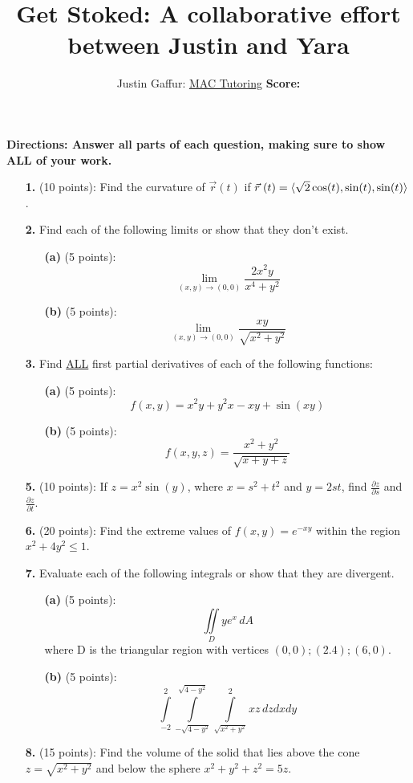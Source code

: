 \documentclass[a4paper, 12pt]{article} %
\title[Gaffur: Practice Exam]{Get Stoked: A collaborative effort between Justin and Yara}
\author[MAC Tutoring]{Justin Gaffur: \hspace{2mm}  \underline{MAC Tutoring} \hspace{35mm} \textbf{Score:}}
\numberwithin{equation}{section}
\begin{document}
\maketitle %

\textbf{Directions: Answer all parts of each question, making sure to show ALL of your work.}
\begin{enumerate}
\item[\textbf{1.}] (10 points): Find the curvature of $\vec{r}(t)$ if $\vec{r}\hspace{1mm}(t)=\langle \sqrt{2}\cos(t), \sin(t), \sin(t) \rangle$.
\vspace{75mm}

\item[\textbf{2.}] Find each of the following limits or show that they don't exist.
\begin{enumerate}
\item[\textbf{(a)}] (5 points):
$$
\lim_{(x,y)\to (0,0)}\frac{2x^2y}{x^4+y^2}
$$
\vspace{60mm}
\item[\textbf{(b)}] (5 points):
$$
\lim_{(x,y)\to (0,0)}\frac{xy}{\sqrt{x^2+y^2}}
$$
\vspace{70mm}
\end{enumerate}
\item[\textbf{3.}] Find \underline{ALL} first partial derivatives of each of the following functions:
\begin{enumerate}
\item[\textbf{(a)}] (5 points):
$$
f(x,y)=x^2y+y^2x-xy+\sin(xy)
$$
\vspace{50mm}
\item[\textbf{(b)}] (5 points):
$$
f(x,y,z)=\frac{x^2+y^2}{\sqrt{x+y+z}}
$$
\vspace{50mm}
\end{enumerate}
\item[\textbf{5.}] (10 points): If $z=x^2\sin(y)$, \hspace{1mm} where $x=s^2+t^2$ and $y=2st$, find $\frac{\partial{z}}{\partial{s}}$ and $\frac{\partial{z}}{\partial{t}}$.
\vspace{115mm}	
\item[\textbf{6.}] (20 points): Find the extreme values of $f(x,y)=e^{-xy}$ within the region $x^2+4y^2\leq1$.
\vspace{110mm}

\item[\textbf{7.}] Evaluate each of the following integrals or show that they are divergent.
\begin{enumerate}
\item[\textbf{(a)}] (5 points):
$$
\iint\limits_{D}ye^{x}\, dA
$$
where D is the triangular region with vertices $(0,0); (2.4); (6,0)$.
\vspace{85mm}
\item[\textbf{(b)}] (5 points):
$$
\int\limits_{-2}^{2}\int\limits_{-\sqrt{4-y^2}}^{\sqrt{4-y^2}}\int\limits_{\sqrt{x^2+y^2}}^{2}xz\, dzdxdy
$$
\end{enumerate}
\vspace{80mm}
\item[\textbf{8.}] (15 points): Find the volume of the solid that lies above the cone $z = \sqrt{x^2+y^2}$ and below the sphere $x^2+y^2+z^2= 5z$.



\end{enumerate}
\end{document}
